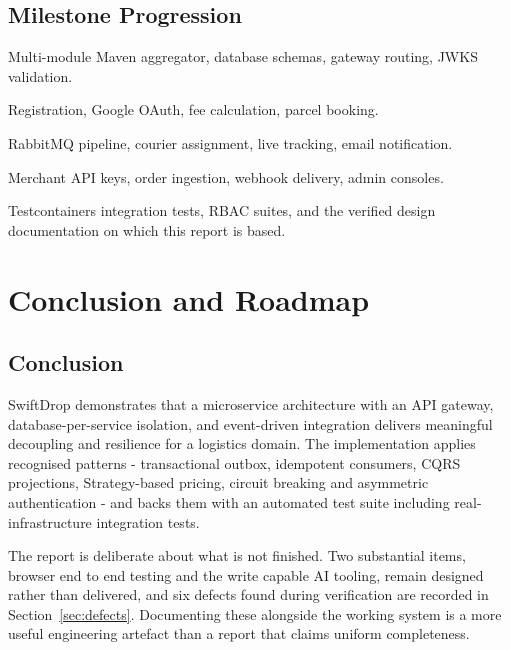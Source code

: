 \documentclass[11pt,a4paper,oneside,openany]{report}
\begin{document}
\section{Milestone Progression}
\begin{description}[leftmargin=1.9cm,style=sameline]
\item[M1 - Foundation] Multi-module Maven aggregator, database schemas, gateway routing, JWKS
validation.
\item[M2 - Core flows] Registration, Google OAuth, fee calculation, parcel booking.
\item[M3 - Events] RabbitMQ pipeline, courier assignment, live tracking, email notification.
\item[M4 - Partner \& admin] Merchant API keys, order ingestion, webhook delivery, admin
consoles.
\item[M5 - Hardening] Testcontainers integration tests, RBAC suites, and the verified design
documentation on which this report is based.
\end{description}

\chapter{Conclusion and Roadmap}

\section{Conclusion}
SwiftDrop demonstrates that a microservice architecture with an API gateway, database-per-service
isolation, and event-driven integration delivers meaningful decoupling and resilience for a
logistics domain. The implementation applies recognised patterns - transactional outbox, idempotent
consumers, CQRS projections, Strategy-based pricing, circuit breaking and asymmetric
authentication - and backs them with an automated test suite including real-infrastructure
integration tests.

The report is deliberate about what is not finished. Two substantial items, browser end to end
testing and the write capable AI tooling, remain designed rather than delivered, and six defects
found during verification are recorded in
Section~\ref{sec:defects}. Documenting these alongside the working system is a more useful
engineering artefact than a report that claims uniform completeness.
\end{document}
